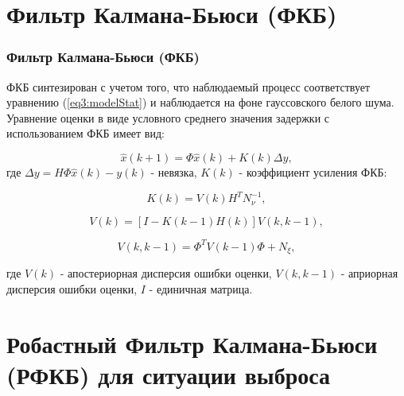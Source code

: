 \documentclass[10pt,pdf,hyperref={unicode}]{beamer}
\begin{document}
\section{Фильтр Калмана-Бьюси (ФКБ)}

\begin{frame}
\frametitle{Фильтр Калмана-Бьюси (ФКБ)}

ФКБ синтезирован с учетом того, что наблюдаемый процесс соответствует уравнению (\ref{eq3:modelStat}) и наблюдается на фоне гауссовского белого шума.
 Уравнение оценки в виде условного среднего значения задержки с использованием ФКБ имеет вид:


\begin{equation}\label{eq3:Estim_rel}
\hat{x}(k+1)=\Phi\hat{x}(k)+K(k)\Delta y,
\end{equation}
\noindent где $\Delta y=H\Phi\hat{x}(k)-y(k)$ - невязка, $K(k)$ - коэффициент усиления ФКБ:

\begin{equation}\label{eq3:K}
K(k)=V(k)H^TN_{\nu}^{-1},
\end{equation}
 
\begin{equation}\label{eq3:V}
V(k)=[I-K(k-1)H(k)]V(k,k-1),
\end{equation}


\begin{equation}\label{eq3:Vkk-1}
V(k,k-1)=\Phi^TV(k-1)\Phi+N_\xi,
\end{equation}

\noindent где $V(k)$ - апостериорная дисперсия ошибки оценки, $V(k,k-1)$ - априорная дисперсия ошибки оценки, $I$ - единичная матрица.

\end{frame}

\section{Робастный Фильтр Калмана-Бьюси (РФКБ) для ситуации выброса}
\end{document}
